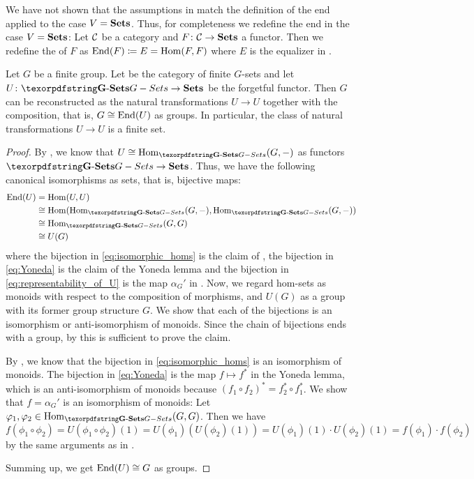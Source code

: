 \begin{rem}\label{rem:redefinition_of_the_end}
We have not shown that the assumptions in  match the definition of the end applied to the case $V = {{\operatorname{\mathbf{Sets}}}}$. Thus, for completeness we redefine the end in the case $V = {{\operatorname{\mathbf{Sets}}}}$: Let $\mathcal{C}$ be a category and $F\colon \mathcal{C} \to {\ensuremath{{\operatorname{\mathbf{Sets}}}}}$ a functor. Then we redefine the  of $F$ as $\operatorname{End}(F) \coloneqq E = \operatorname{Hom}(F,F)$ where $E$ is the equalizer in .
\end{rem}

\begin{thm}\label{thm:tannaka_duality_for_Gset}
Let $G$ be a finite group. Let \Gset{} be the category of finite $G$-sets and let $U\colon \Gset \to \Set$ be the forgetful functor. Then $G$ can be reconstructed as the natural transformations $U \to U$ together with the composition, that is, $G \cong \operatorname{End}(U)$ as groups. In particular, the class of natural transformations $U \to U$ is a finite set.
\end{thm}
\begin{proof}
By , we know that $U \cong \Hom_{\Gset}(G,-)$ as functors $\Gset \to \Set$. Thus, we have the following canonical isomorphisms as sets, that is, bijective maps:
\begin{align}
\End(U) &= \Hom(U,U)\nonumber\\
&\cong \Hom(\Hom_{\Gset}(G,-),\Hom_{\Gset}(G,-)) \label{eq:isomorphic_homs}\\
&\cong \Hom_{\Gset}(G,G) \label{eq:Yoneda}\\
&\cong U(G) \label{eq:representability_of_U}
\end{align}
where the bijection in \eqref{eq:isomorphic_homs} is the claim of , the bijection in \eqref{eq:Yoneda} is the claim of the Yoneda lemma and the bijection in \eqref{eq:representability_of_U} is the map $\alpha_G'$ in . Now, we regard hom-sets as monoids with respect to the composition of morphisms, and $U(G)$ as a group with its former group structure $G$. We show that each of the bijections is an isomorphism or anti-isomorphism of monoids. Since the chain of bijections ends with a group, by  this is sufficient to prove the claim.

By , we know that the bijection in \eqref{eq:isomorphic_homs} is an isomorphism of monoids. The bijection in \eqref{eq:Yoneda} is the map $f \mapsto f^*$ in the Yoneda lemma, which is an anti-isomorphism of monoids because $(f_1 \circ f_2)^* = f_2^* \circ f_1^*$. We show that $f = \alpha_G'$ is an isomorphism of monoids: Let $\phi_1,\phi_2 \in \Hom_{\Gset}(G,G)$. Then we have \[f(\phi_1 \circ \phi_2) = U(\phi_1 \circ \phi_2)(1) = U(\phi_1)(U(\phi_2)(1)) = U(\phi_1)(1) \cdot U(\phi_2)(1) = f(\phi_1) \cdot f(\phi_2)\] by the same arguments as in .

Summing up, we get $\operatorname{End}(U) \cong G$ as groups.
\end{proof}


